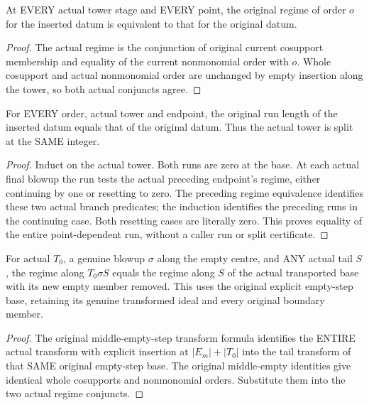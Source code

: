 \begin{lemma}
\label{hir:original-positive-companion-empty-regime}
\leanok
At EVERY actual tower stage and EVERY point, the original regime of order $o$ for the inserted datum is equivalent to that for the original datum.
\end{lemma}
\begin{proof}
The actual regime is the conjunction of original current cosupport membership and equality of the current nonmonomial order with $o$. Whole cosupport and actual nonmonomial order are unchanged by empty insertion along the tower, so both actual conjuncts agree.
\end{proof}

\begin{lemma}
\label{hir:original-positive-companion-empty-run}
\leanok
For EVERY order, actual tower and endpoint, the original run length of the inserted datum equals that of the original datum. Thus the actual tower is split at the SAME integer.
\end{lemma}
\begin{proof}
Induct on the actual tower. Both runs are zero at the base. At each actual final blowup the run tests the actual preceding endpoint's regime, either continuing by one or resetting to zero. The preceding regime equivalence identifies these two actual branch predicates; the induction identifies the preceding runs in the continuing case. Both resetting cases are literally zero. This proves equality of the entire point-dependent run, without a caller run or split certificate.
\end{proof}

\begin{lemma}
\label{hir:original-positive-companion-middle-empty-regime}
\leanok
For actual $T_0$, a genuine blowup $\sigma$ along the empty centre, and ANY actual tail $S$, the regime along $T_0\sigma S$ equals the regime along $S$ of the actual transported base with its new empty member removed. This uses the original explicit empty-step base, retaining its genuine transformed ideal and every original boundary member.
\end{lemma}
\begin{proof}
The original middle-empty-step transform formula identifies the ENTIRE actual transform with explicit insertion at $|E_m|+|T_0|$ into the tail transform of that SAME original empty-step base. The original middle-empty identities give identical whole cosupports and nonmonomial orders. Substitute them into the two actual regime conjuncts.
\end{proof}

